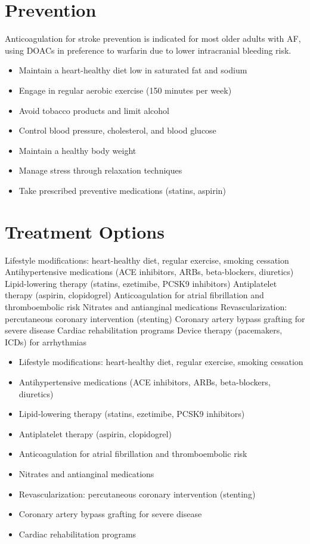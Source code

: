 \section{Prevention}
Anticoagulation for stroke prevention is indicated for most older adults with AF, using DOACs in preference to warfarin due to lower intracranial bleeding risk.

\begin{itemize}[noitemsep]
  \item Maintain a heart-healthy diet low in saturated fat and sodium
  \item Engage in regular aerobic exercise (150 minutes per week)
  \item Avoid tobacco products and limit alcohol
  \item Control blood pressure, cholesterol, and blood glucose
  \item Maintain a healthy body weight
  \item Manage stress through relaxation techniques
  \item Take prescribed preventive medications (statins, aspirin)
\end{itemize}
\section{Treatment Options}
Lifestyle modifications: heart-healthy diet, regular exercise, smoking cessation Antihypertensive medications (ACE inhibitors, ARBs, beta-blockers, diuretics) Lipid-lowering therapy (statins, ezetimibe, PCSK9 inhibitors) Antiplatelet therapy (aspirin, clopidogrel) Anticoagulation for atrial fibrillation and thromboembolic risk Nitrates and antianginal medications Revascularization: percutaneous coronary intervention (stenting) Coronary artery bypass grafting for severe disease Cardiac rehabilitation programs Device therapy (pacemakers, ICDs) for arrhythmias

\begin{itemize}[noitemsep]
  \item Lifestyle modifications: heart-healthy diet, regular exercise, smoking cessation
  \item Antihypertensive medications (ACE inhibitors, ARBs, beta-blockers, diuretics)
  \item Lipid-lowering therapy (statins, ezetimibe, PCSK9 inhibitors)
  \item Antiplatelet therapy (aspirin, clopidogrel)
  \item Anticoagulation for atrial fibrillation and thromboembolic risk
  \item Nitrates and antianginal medications
  \item Revascularization: percutaneous coronary intervention (stenting)
  \item Coronary artery bypass grafting for severe disease
  \item Cardiac rehabilitation programs
\end{itemize}

